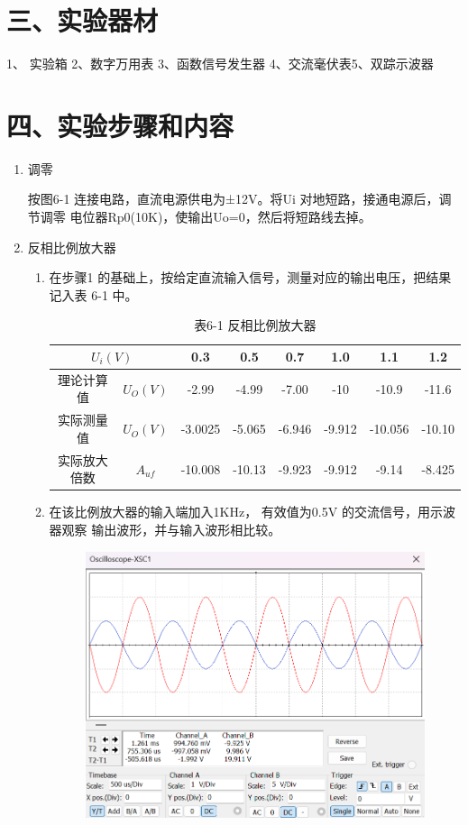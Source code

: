 \documentclass[a4paper,10pt,notitlepage]{article}
\begin{document}
	\section*{三、实验器材}
	1、 实验箱 2、数字万用表 3、函数信号发生器 4、交流毫伏表5、双踪示波器
	\section*{四、实验步骤和内容}
	\begin{enumerate}
		\item 调零\par 
		按图6-1 连接电路，直流电源供电为±12V。将Ui 对地短路，接通电源后，调节调零
		电位器Rp0(10K)，使输出Uo=0，然后将短路线去掉。
		\item  反相比例放大器 \par 
		\begin{enumerate}
			\item 在步骤1 的基础上，按给定直流输入信号，测量对应的输出电压，把结果记入表
			6-1 中。
			\begin{table}[h]
				\centering
				\begin{tabular}{|c|c|c|c|c|c|c|c|}
					\hline
					\multicolumn{2}{|c|}{$U_i(V)$} & 0.3 & 0.5 & 0.7 & 1.0 & 1.1 & 1.2 \\
					\hline
					理论计算值 & $U_O(V)$ & -2.99 & -4.99 & -7.00 & -10 & -10.9 & -11.6 \\
					\hline
					实际测量值 & $U_O(V)$ & -3.0025 & -5.065 & -6.946 & -9.912 & -10.056 & -10.10 \\
					\hline
					实际放大倍数 & $A_{uf}$ & -10.008 & -10.13 & -9.923 & -9.912 & -9.14 & -8.425 \\
					\hline
				\end{tabular}
				\caption*{表6-1 反相比例放大器}
			\end{table}
			\item 在该比例放大器的输入端加入1KHz， 有效值为0.5V 的交流信号，用示波器观察
			输出波形，并与输入波形相比较。
			\begin{figure}[h]
				\raggedright
				\begin{minipage}{0.3\textwidth}
					\centering
					\includegraphics[width=\textwidth]{预习报告/3.png}

\end{minipage}
\end{figure}
\end{enumerate}
\end{enumerate}
\end{document}
